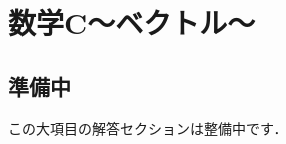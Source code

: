 \documentclass[../../ms_a.tex]{subfiles}
\begin{document}
\section{数学C～ベクトル～}

\subsection*{準備中}
この大項目の解答セクションは整備中です．
\end{document}
